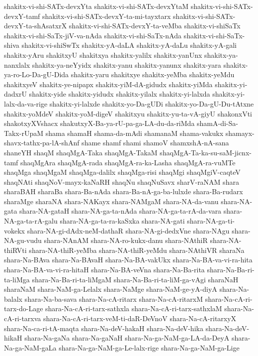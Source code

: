 {shakitx-vi-shi-SATx-devxYta
shakitx-vi-shi-SATx-devxYtaM
shakitx-vi-shi-SATx-devxY-tamf
shakitx-vi-shi-SATx-devxY-ta-mi-tayxtarx
shakitx-vi-shi-SATx-devxY-ta-shAsatxrX
shakitx-vi-shi-SATx-devxY-ta-veMba
shakitx-vi-shiSaTx
shakitx-vi-shi-SaTx-jiV-va-nAda
shakitx-vi-shi-SaTx-nAda
shakitx-vi-shi-SaTx-shiva
shakitx-vi-shiSwTx
shakitx-yA-daLA
shakitx-yA-daLu
shakitx-yA-gali
shakitx-yAru
shakitxyU
shakitxya
shakitx-yalilx
shakitx-yanUnx
shakitx-ya-nanxlalx
shakitx-ya-neYyidx
shakitx-yanu
shakitx-yanunx
shakitx-yara
shakitx-ya-ro-Lo-Da-gU-Dida
shakitx-yaru
shakitxye
shakitx-yeMba
shakitx-yeMdu
shakitxyeV
shakitx-ye-nipapx
shakitx-yiM-dA-gidudx
shakitx-yiMda
shakitx-yi-dadxrU
shakitx-yide
shakitx-yidudx
shakitx-yilalx
shakitx-yi-lalxda
shakitx-yi-lalx-da-va-rige
shakitx-yi-lalxde
shakitx-yo-Da-gUDi
shakitx-yo-Da-gU-Du-tAtxne
shakitx-yoMdeV
shakitx-yoM-digeV
shakitxyu
shakitx-yu-ta-vA-giyU
shakonxVti
shakotxyXVshacx
shakutxyX-Ba-ya-rU-pa-ga-LA-du-da-riMda
shamA-di-Sa-Takx-rUpaM
shama
shamaH
shama-da-mAdi
shamanaM
shama-vakukx
shamayx-shavx-tathx-pa-lA-shAnf
shame
shamf
shami
shamoV
shamxshA-nA-sana
shaneYH
shaqM
shaqMgA-Taka
shaqMgA-TakaM
shaqMgA-Ta-ka-su-saM-jicnx-tamf
shaqMgAra
shaqMgA-rada
shaqMgA-ra-ka-Lasha
shaqMgA-ra-vuMTe
shaqMga
shaqMgaM
shaqMga-dalilx
shaqMga-risi
shaqMgi
shaqMgiV-caqteV
shaqNAti
shaqNoV-mayx-kaNaRH
shaqNu
shaqNuSavx
sharV-raNAM
shara
sharaBAH
sharaBa
shara-Ba-nAda
shara-Ba-nA-ga-ba-lulxde
shara-Ba-rudarx
sharaMge
sharaNA
shara-NAKayx
shara-NAMgaM
shara-NA-da-vanu
shara-NA-gata
shara-NA-gataH
shara-NA-ga-ta-nAda
shara-NA-ga-ta-rA-da-vara
shara-NA-ga-ta-rA-galu
shara-NA-ga-ta-ra-kaSxka
shara-NA-gati
shara-NA-ga-ti-vokekx
shara-NA-gi-dAdx-neM-dathaR
shara-NA-gi-dedxVne
shara-NAgu
shara-NA-gu-vudu
shara-NAnAM
shara-NA-ro-kukx-danu
shara-NAthiR
shara-NA-thiRVti
shara-NA-thiR-yeMba
shara-NA-thiR-yeMdu
shara-NAthiVR
sharaNa
shara-Na-BAva
shara-Na-BAvaH
shara-Na-BA-vakUkx
shara-Na-BA-va-vi-ra-hita
shara-Na-BA-va-vi-ra-hitaH
shara-Na-BA-veVna
shara-Na-Ba-rita
shara-Na-Ba-ri-ta-liMga
shara-Na-Ba-ri-ta-liMgaM
shara-Na-Ba-ri-ta-liM-ga-vAgi
sharaNaH
sharaNaM
shara-NaM-ga-Lelalx
shara-NaMge
shara-NaM-ge-yA-diyA
shara-Na-balalx
shara-Na-ba-sava
shara-Na-cA-ritarx
shara-Na-cA-ritarxM
shara-Na-cA-ri-tarx-do-Lage
shara-Na-cA-ri-tarx-sathxla
shara-Na-cA-ri-tarx-sathxlaM
shara-Na-cA-ri-tarxva
shara-Na-cA-ri-tarx-veM-ti-daR-DeVnoV
shara-Na-cA-ritarxyX
shara-Na-ca-ri-tA-maqta
shara-Na-deV-hakaH
shara-Na-deV-hika
shara-Na-deV-hikaH
shara-Na-gaNa
shara-Na-gaNaH
shara-Na-ga-NaM-ga-LA-da-DeyA
shara-Na-ga-NaM-gaLa
shara-Na-ga-NaM-ga-Le-lalx-rige
shara-Na-ga-NaM-ga-Lige
}
